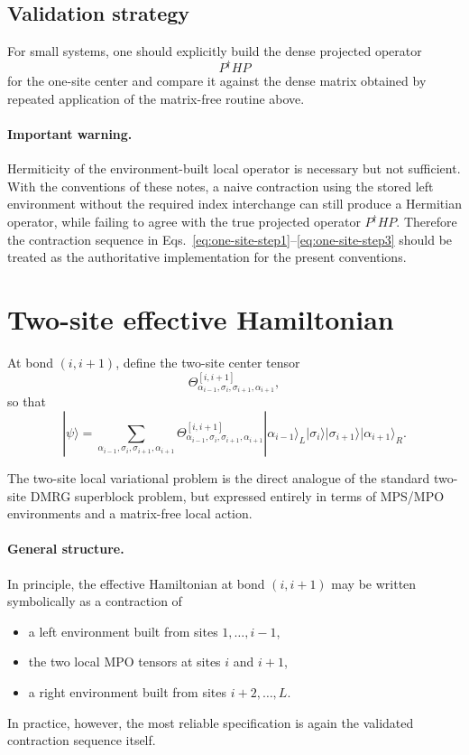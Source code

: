 \documentclass[aps,prb,onecolumn,nofootinbib]{revtex4-2}
\newcommand{\ket}[1]{|#1\rangle}
\begin{document}
	\subsection{Validation strategy}
	
	For small systems, one should explicitly build the dense projected operator
	\[
	P^\dagger H P
	\]
	for the one-site center and compare it against the dense matrix obtained by repeated
	application of the matrix-free routine above.
	
	\paragraph{Important warning.}
	Hermiticity of the environment-built local operator is necessary but not sufficient.
	With the conventions of these notes, a naive contraction using the stored left environment
	without the required index interchange can still produce a Hermitian operator, while failing
	to agree with the true projected operator \(P^\dagger H P\). Therefore the contraction
	sequence in Eqs.~\eqref{eq:one-site-step1}--\eqref{eq:one-site-step3} should be treated as
	the authoritative implementation for the present conventions.
	
	\section{Two-site effective Hamiltonian}
	
	At bond $(i,i+1)$, define the two-site center tensor
	\begin{equation}
		\Theta^{[i,i+1]}_{\alpha_{i-1},\sigma_i,\sigma_{i+1},\alpha_{i+1}},
		\label{eq:theta-def}
	\end{equation}
	so that
	\begin{equation}
		\ket{\psi}
		=
		\sum_{\alpha_{i-1},\sigma_i,\sigma_{i+1},\alpha_{i+1}}
		\Theta^{[i,i+1]}_{\alpha_{i-1},\sigma_i,\sigma_{i+1},\alpha_{i+1}}
		\ket{\alpha_{i-1}}_L \ket{\sigma_i}\ket{\sigma_{i+1}} \ket{\alpha_{i+1}}_R.
		\label{eq:two-site-state}
	\end{equation}
	
	The two-site local variational problem is the direct analogue of the standard
	two-site DMRG superblock problem, but expressed entirely in terms of MPS/MPO
	environments and a matrix-free local action.
	
	\paragraph{General structure.}
	In principle, the effective Hamiltonian at bond $(i,i+1)$ may be written symbolically
	as a contraction of
	\begin{itemize}
		\item a left environment built from sites $1,\dots,i-1$,
		\item the two local MPO tensors at sites $i$ and $i+1$,
		\item a right environment built from sites $i+2,\dots,L$.
	\end{itemize}
	In practice, however, the most reliable specification is again the validated contraction
	sequence itself.
	
\end{document}
